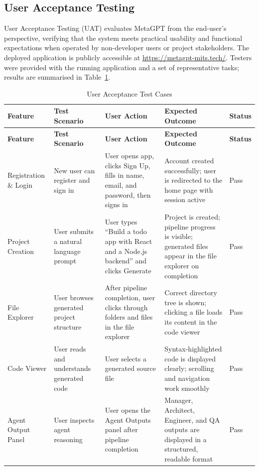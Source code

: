 \subsection{User Acceptance Testing}

User Acceptance Testing (UAT) evaluates MetaGPT from the end-user's perspective, verifying that the system meets practical usability and functional expectations when operated by non-developer users or project stakeholders. The deployed application is publicly accessible at \url{https://metagpt-mits.tech/}. Testers were provided with the running application and a set of representative tasks; results are summarised in Table~\ref{tab:uat}.

\renewcommand{\arraystretch}{1.2}
\begin{longtable}{|p{3.2cm}|p{3.6cm}|p{3.6cm}|p{4.0cm}|>{\centering\arraybackslash}p{1.6cm}|}
\caption{User Acceptance Test Cases}
\label{tab:uat}
\\
\hline
\textbf{Feature} & \textbf{Test Scenario} & \textbf{User Action} & \textbf{Expected Outcome} & \textbf{Status} \\
\hline
\endfirsthead
\hline
\textbf{Feature} & \textbf{Test Scenario} & \textbf{User Action} & \textbf{Expected Outcome} & \textbf{Status} \\
\hline
\endhead
\hline
\endfoot
\hline
\endlastfoot
Registration \& Login & New user can register and sign in & User opens app, clicks Sign Up, fills in name, email, and password, then signs in & Account created successfully; user is redirected to the home page with session active & Pass \\
\hline
Project Creation & User submits a natural language prompt & User types ``Build a todo app with React and a Node.js backend'' and clicks Generate & Project is created; pipeline progress is visible; generated files appear in the file explorer on completion & Pass \\
\hline
File Explorer & User browses generated project structure & After pipeline completion, user clicks through folders and files in the file explorer & Correct directory tree is shown; clicking a file loads its content in the code viewer & Pass \\
\hline
Code Viewer & User reads and understands generated code & User selects a generated source file & Syntax-highlighted code is displayed clearly; scrolling and navigation work smoothly & Pass \\
\hline
Agent Output Panel & User inspects agent reasoning & User opens the Agent Outputs panel after pipeline completion & Manager, Architect, Engineer, and QA outputs are displayed in a structured, readable format & Pass \\

\end{longtable}
